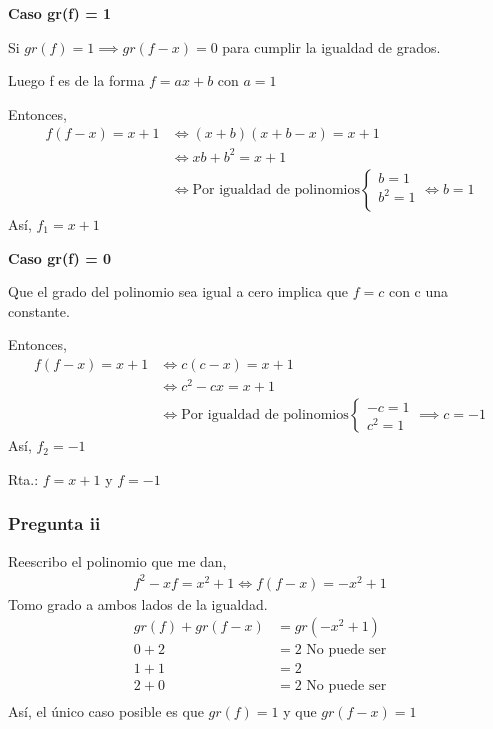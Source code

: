 \textbf{Caso gr(f) = 1}

Si $ gr(f) = 1 \implies gr(f-x) = 0 $ para cumplir la igualdad de grados.

Luego f es de la forma $ f = ax+b $ con $ a = 1 $

Entonces,
\begin{align*}
    f(f-x) = x+1 &\iff (x+b)(x+b-x) = x+1 \\
    &\iff xb + b^2 = x+1 \\
    &\iff \text{Por igualdad de polinomios} \begin{cases}
        b = 1 \\
        b^2 = 1 \\
    \end{cases} \iff b = 1
\end{align*}
Así, $ f_1 = x+1 $

\textbf{Caso gr(f) = 0}

Que el grado del polinomio sea igual a cero implica que $ f = c $ con c una constante.

Entonces,
\begin{align*}
    f(f-x) = x+1 &\iff c(c-x) = x+1 \\
    &\iff c^2 - cx = x+1 \\
    &\iff \text{Por igualdad de polinomios} \begin{cases}
        -c = 1 \\
        c^2 = 1
    \end{cases} \implies c = -1
\end{align*}
Así, $ f_2 = -1 $

Rta.: $ f = x+1 $ y $ f=-1 $

\subsubsection{Pregunta ii}

Reescribo el polinomio que me dan,
\begin{align*}
    f^2 - xf = x^2 + 1 \iff f(f-x) = -x^2 + 1
\end{align*}
Tomo grado a ambos lados de la igualdad.
\begin{align*}
    gr(f) + gr(f-x) &= gr(-x^2 + 1) \\
    0 + 2 &= 2 \text{ No puede ser} \\
    1 + 1 &= 2 \\
    2 + 0 &= 2 \text{ No puede ser} \\
\end{align*}
Así, el único caso posible es que $ gr(f) = 1 $ y que $ gr(f-x) = 1 $


